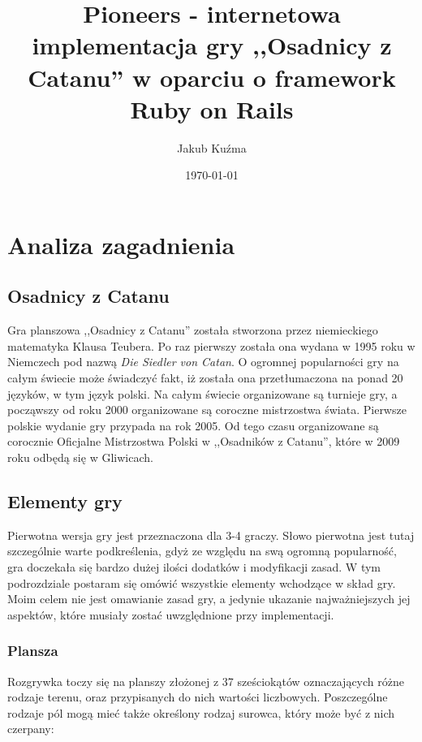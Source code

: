 \documentclass[a4paper,12pt]{article}
\begin{document}
\author{Jakub Kuźma}
\title{Pioneers - internetowa implementacja gry ,,Osadnicy z Catanu''
  w oparciu o framework Ruby on Rails}
\date{\today}

\begin{titlepage}
\maketitle
\end{titlepage}

\section{Analiza zagadnienia}

\subsection{Osadnicy z Catanu}
Gra planszowa ,,Osadnicy z Catanu'' została stworzona przez
niemieckiego matematyka Klausa Teubera. Po raz pierwszy została ona
wydana w 1995 roku w Niemczech pod nazwą \emph{Die Siedler von
  Catan}. O ogromnej popularności gry na całym świecie może świadczyć
fakt, iż została ona przetłumaczona na ponad 20 języków, w tym język
polski. Na całym świecie organizowane są turnieje gry, a począwszy od
roku 2000 organizowane są coroczne mistrzostwa świata. Pierwsze
polskie wydanie gry przypada na rok 2005. Od tego czasu organizowane
są corocznie Oficjalne Mistrzostwa Polski w ,,Osadników z Catanu'',
które w 2009 roku odbędą się w Gliwicach.

\subsection{Elementy gry}
Pierwotna wersja gry jest przeznaczona dla 3-4 graczy. Słowo pierwotna
jest tutaj szczególnie warte podkreślenia, gdyż ze względu na swą
ogromną popularność, gra doczekała się bardzo dużej ilości dodatków i
modyfikacji zasad. W tym podrozdziale postaram się omówić wszystkie
elementy wchodzące w skład gry. Moim celem nie jest omawianie zasad
gry, a jedynie ukazanie najważniejszych jej aspektów, które musiały
zostać uwzględnione przy implementacji.

\subsubsection{Plansza}
Rozgrywka toczy się na planszy złożonej z 37 sześciokątów
oznaczających różne rodzaje terenu, oraz przypisanych do nich wartości
liczbowych. Poszczególne rodzaje pól mogą mieć także określony rodzaj
surowca, który może być z nich czerpany:
\end{document}
